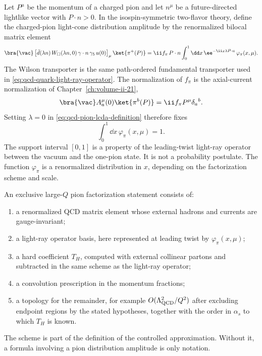 Let \(P^\mu\) be the momentum of a charged pion and let \(n^\mu\) be a
future-directed lightlike vector with \(P\cdot n>0\).  In the isospin-symmetric
two-flavor theory, define the charged-pion light-cone distribution amplitude
by the renormalized bilocal matrix element
\begin{equation}
  \bra{\vac}
  \left[
  \bar d(\lambda n)\,
  W_{\square}(\lambda n,0)\,
  \gamma\cdot n\,\gamma_5\,u(0)
  \right]_{\mu}
  \ket{\pi^+(P)}
  =
  \ii f_\pi\,P\cdot n
  \int_0^1\dd x\,
  \ee^{-\ii x\lambda P\cdot n}\,
  \varphi_\pi(x,\mu).
  \label{eq:qcd-pion-lcda-definition}
\end{equation}
The Wilson transporter is the same path-ordered fundamental transporter used
in \eqref{eq:qcd-quark-light-ray-operator}.  The normalization of \(f_\pi\) is
the axial-current normalization of Chapter~\ref{ch:volume-ii-21},
\[
  \bra{\vac}A_a^\mu(0)\ket{\pi^b(P)}
  =
  \ii f_\pi P^\mu\delta_a{}^b .
\]
Setting \(\lambda=0\) in
\eqref{eq:qcd-pion-lcda-definition} therefore fixes
\begin{equation}
  \int_0^1\dd x\,\varphi_\pi(x,\mu)=1 .
  \label{eq:qcd-pion-lcda-normalization}
\end{equation}
The support interval \([0,1]\) is a property of the leading-twist light-ray
operator between the vacuum and the one-pion state.  It is not a probability
postulate.  The function \(\varphi_\pi\) is a renormalized distribution in
\(x\), depending on the factorization scheme and scale.

\begin{definition}
\label{def:qcd-exclusive-pion-factorization-scheme}
An exclusive large-\(Q\) pion factorization statement consists of:
\begin{enumerate}
  \item a renormalized QCD matrix element whose external hadrons and currents
  are gauge-invariant;
  \item a light-ray operator basis, here represented at leading twist by
  \(\varphi_\pi(x,\mu)\);
  \item a hard coefficient \(T_H\), computed with external collinear partons
  and subtracted in the same scheme as the light-ray operator;
  \item a convolution prescription in the momentum fractions;
  \item a topology for the remainder, for example
  \(O(\Lambda_{\rm QCD}^2/Q^2)\) after excluding endpoint regions by the
  stated hypotheses, together with the order in \(\alpha_s\) to which
  \(T_H\) is known.
\end{enumerate}
The scheme is part of the definition of the controlled approximation.  Without
it, a formula involving a pion distribution amplitude is only notation.
\end{definition}

